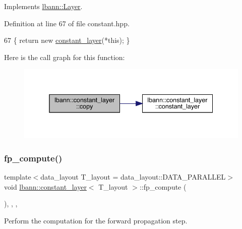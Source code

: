Implements \hyperlink{classlbann_1_1Layer_af420f22bbac801c85483ade84588a23f}{lbann\+::\+Layer}.



Definition at line 67 of file constant.\+hpp.


\begin{DoxyCode}
67 \{ \textcolor{keywordflow}{return} \textcolor{keyword}{new} \hyperlink{classlbann_1_1constant__layer_a00b24316ac4ac313feb751cb00d850fc}{constant\_layer}(*\textcolor{keyword}{this}); \}
\end{DoxyCode}
Here is the call graph for this function\+:\nopagebreak
\begin{figure}[H]
\begin{center}
\leavevmode
\includegraphics[width=338pt]{classlbann_1_1constant__layer_adf44af96fef92b565a933b04fecd0fa2_cgraph}
\end{center}
\end{figure}
\mbox{\label{classlbann_1_1constant__layer_a15b919ed869f2c815e1613dfb42b317c}} 
\subsubsection{\texorpdfstring{fp\+\_\+compute()}{fp\_compute()}}
{\footnotesize\ttfamily template$<$data\+\_\+layout T\+\_\+layout = data\+\_\+layout\+::\+D\+A\+T\+A\+\_\+\+P\+A\+R\+A\+L\+L\+EL$>$ \\
void \hyperlink{classlbann_1_1constant__layer}{lbann\+::constant\+\_\+layer}$<$ T\+\_\+layout $>$\+::fp\+\_\+compute (\begin{DoxyParamCaption}{ }\end{DoxyParamCaption})\hspace{0.3cm}{\ttfamily [inline]}, {\ttfamily [override]}, {\ttfamily [protected]}, {\ttfamily [virtual]}}

Perform the computation for the forward propagation step. 


